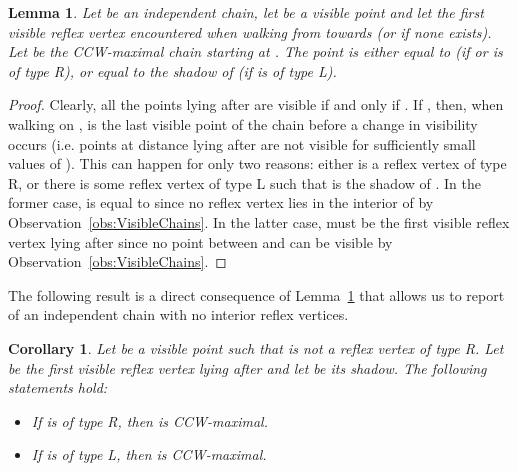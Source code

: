 \documentclass[a4paper]{article}
\newtheorem{lemma}{Lemma}
\newtheorem{corollary}{Corollary}
\begin{document}
\begin{lemma}\label{lem_key}
Let  be an independent chain, let  be a visible point and let  the first visible reflex vertex encountered when walking from  towards  (or  if none exists). Let  be the CCW-maximal chain starting at . The point  is either equal to  (if  or  is of type R), or equal to the shadow of  (if  is of type L).
\end{lemma}
\begin{proof}
Clearly, all the points lying after  are visible if and only if .
If , then, when walking on ,  is the last visible point of the chain before a change in visibility occurs (i.e. points at distance  lying after  are not visible for sufficiently small values of ).
This can happen for only two reasons: either  is a reflex vertex of type R, or there is some reflex vertex  of type L such that  is the shadow of .
In the former case,  is equal to  since no reflex vertex lies in the interior of  by Observation~\ref{obs:VisibleChains}.
In the latter case,  must be the first visible reflex vertex lying after  since no point between  and  can be visible by Observation~\ref{obs:VisibleChains}.
\end{proof}

The following result is a direct consequence of Lemma~\ref{lem_key} that allows us to report  of an independent chain  with no interior reflex vertices. 

\begin{corollary}\label{corollary:CharacterizationVisibleReflex}
Let  be a visible point such that  is not a reflex vertex of type R. 
Let  be the first visible reflex vertex lying after  and let  be its shadow. The following statements hold:
\begin{itemize}
\vspace{-1mm}\item[-] If  is of type R, then  is CCW-maximal.
\vspace{-1mm}\item[-] If  is of type L, then  is CCW-maximal.
\end{itemize}
\end{corollary}
\end{document}
